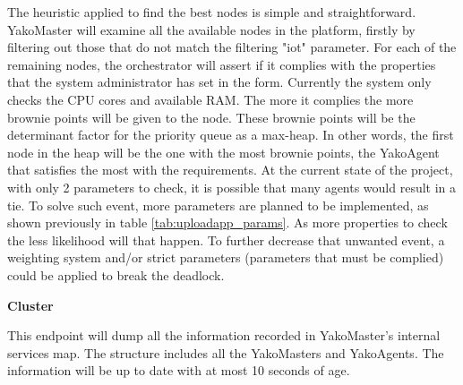             The heuristic applied to find the best nodes is simple and straightforward. YakoMaster will examine all the available nodes in the platform, firstly by filtering out those that do not match the filtering "iot" parameter. For each of the remaining nodes, the orchestrator will assert if it complies with the properties that the system administrator has set in the form. Currently the system only checks the CPU cores and available RAM. The more it complies the more brownie points will be given to the node. These brownie points will be the determinant factor for the priority queue as a max-heap. In other words, the first node in the heap will be the one with the most brownie points, the YakoAgent that satisfies the most with the requirements. At the current state of the project, with only 2 parameters to check, it is possible that many agents would result in a tie. To solve such event, more parameters are planned to be implemented, as shown previously in table \ref{tab:uploadapp_params}. As more properties to check the less likelihood will that happen. To further decrease that unwanted event, a weighting system and/or strict parameters (parameters that must be complied) could be applied to break the deadlock.
            
            
            \textbf{Cluster}
            
            This endpoint will dump all the information recorded in YakoMaster's internal services map. The structure includes all the YakoMasters and YakoAgents. The information will be up to date with at most 10 seconds of age.
            
            
